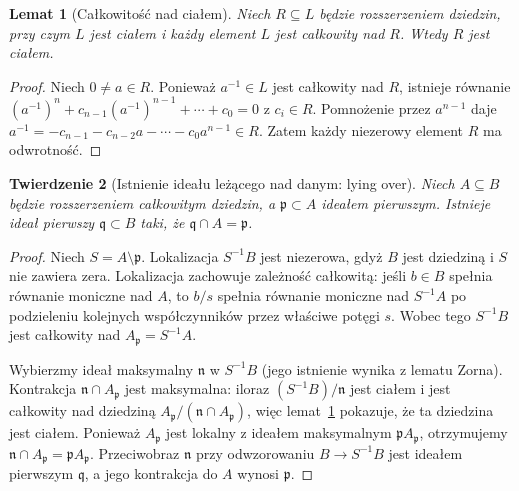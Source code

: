 \documentclass[11pt,a4paper,openany]{report}
\numberwithin{equation}{section}
\theoremstyle{plain}
\newtheorem{twierdzenie}{Twierdzenie}[section]
\newtheorem{lemat}[twierdzenie]{Lemat}
\theoremstyle{definition}
\theoremstyle{remark}
\begin{document}
\begin{lemat}[Całkowitość nad ciałem]
\label{lem:integral-field}
Niech $R\subseteq L$ będzie rozszerzeniem dziedzin,
przy czym $L$ jest ciałem i każdy element $L$ jest
całkowity nad $R$. Wtedy $R$ jest ciałem.
\end{lemat}
\begin{proof}
Niech $0\ne a\in R$. Ponieważ $a^{-1}\in L$ jest
całkowity nad $R$, istnieje równanie
$(a^{-1})^n+c_{n-1}(a^{-1})^{n-1}+\cdots+c_0=0$
z $c_i\in R$. Pomnożenie przez $a^{n-1}$
daje $a^{-1}=-c_{n-1}-c_{n-2}a-\cdots-c_0a^{n-1}\in R$.
Zatem każdy niezerowy element $R$ ma odwrotność.
\end{proof}

\begin{twierdzenie}[Istnienie ideału leżącego nad danym: lying over]
\label{tw:lying-over}
Niech $A\subseteq B$ będzie rozszerzeniem całkowitym
dziedzin, a $\mathfrak p\subset A$ ideałem pierwszym.
Istnieje ideał pierwszy $\mathfrak q\subset B$ taki,
że $\mathfrak q\cap A=\mathfrak p$.
\end{twierdzenie}
\begin{proof}
Niech $S=A\setminus\mathfrak p$. Lokalizacja
$S^{-1}B$ jest niezerowa, gdyż $B$ jest dziedziną
i $S$ nie zawiera zera. Lokalizacja zachowuje
zależność całkowitą: jeśli $b\in B$ spełnia
równanie moniczne nad $A$, to $b/s$ spełnia
równanie moniczne nad $S^{-1}A$ po podzieleniu
kolejnych współczynników przez właściwe potęgi $s$.
Wobec tego $S^{-1}B$ jest całkowity nad
$A_{\mathfrak p}=S^{-1}A$.

Wybierzmy ideał maksymalny $\mathfrak n$ w
$S^{-1}B$ (jego istnienie wynika z lematu Zorna).
Kontrakcja $\mathfrak n\cap A_{\mathfrak p}$
jest maksymalna: iloraz
$(S^{-1}B)/\mathfrak n$ jest ciałem i jest
całkowity nad dziedziną
$A_{\mathfrak p}/(\mathfrak n\cap A_{\mathfrak p})$,
więc lemat~\ref{lem:integral-field} pokazuje,
że ta dziedzina jest ciałem. Ponieważ
$A_{\mathfrak p}$ jest lokalny z ideałem maksymalnym
$\mathfrak p A_{\mathfrak p}$, otrzymujemy
$\mathfrak n\cap A_{\mathfrak p}
=\mathfrak p A_{\mathfrak p}$.
Przeciwobraz $\mathfrak n$ przy odwzorowaniu
$B\to S^{-1}B$ jest ideałem pierwszym
$\mathfrak q$, a jego kontrakcja do $A$
wynosi $\mathfrak p$.
\end{proof}
\end{document}
